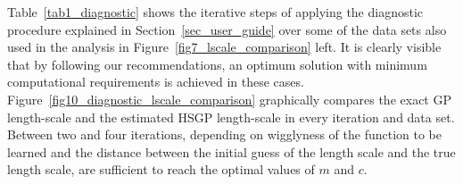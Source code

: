 %
%

Table~\ref{tab1_diagnostic} shows the iterative steps of applying the diagnostic procedure explained in Section~\ref{sec_user_guide} over some of the data sets also used in the analysis in Figure~\ref{fig7_lscale_comparison} left. It is clearly visible that by following our recommendations, an optimum solution with minimum computational requirements is achieved in these cases. Figure~\ref{fig10_diagnostic_lscale_comparison} graphically compares the exact GP length-scale and the estimated HSGP length-scale in every iteration and data set. Between two and four iterations, depending on wigglyness of the function to be learned and the distance between the initial guess of the length scale and the true length scale, are sufficient to reach the optimal values of $m$ and $c$. 

